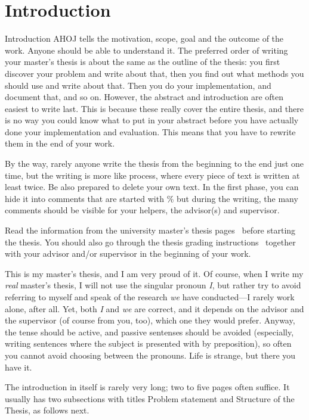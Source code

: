 \chapter{Introduction}
\label{chapter:intro}


Introduction AHOJ tells the motivation, scope, goal and the outcome of the
work. Anyone should be able to understand it. The preferred order of
writing your master's thesis is about the same as the outline of the
thesis: you first discover your problem and write about that, then you
find out what methods you should use and write about that.  Then you
do your implementation, and document that, and so on.  However, the
abstract and introduction are often easiest to write last.  This is
because these really cover the entire thesis, and there is no way you
could know what to put in your abstract before you have actually done
your implementation and evaluation. This means that you have to
rewrite them in the end of your work.

By the way, rarely anyone write the thesis from the beginning to the
end just one time, but the writing is more like process, where every
piece of text is written at least twice. Be also prepared to delete
your own text. In the first phase, you can hide it into comments that
are started with \% but during the writing, the many comments should
be visible for your helpers, the advisor(s) and supervisor.

Read the information from the university master's thesis
pages~\cite{ThesisInstructions} before starting the thesis.  You
should also go through the thesis grading
instructions~\cite{ThesisGrading} together with your advisor and/or
supervisor in the beginning of your work.

This is my master's thesis, and I am very proud of it.  Of course,
when I write my \emph{real} master's thesis, I will not use the
singular pronoun \emph{I}, but rather try to avoid referring to myself
and speak of the research \emph{we} have conducted---I rarely work
alone, after all.  Yet, both \emph{I} and \emph{we} are correct, and
it depends on the advisor and the supervisor (of course from you,
too), which one they would prefer. Anyway, the tense should be active,
and passive sentenses should be avoided (especially, writing sentences
where the subject is presented with by preposition), so often you
cannot avoid choosing between the pronouns. Life is strange, but there
you have it.

The introduction in itself is rarely very long; two to five pages
often suffice. It usually has two subsections with titles Problem
statement and Structure of the Thesis, as follows next.


